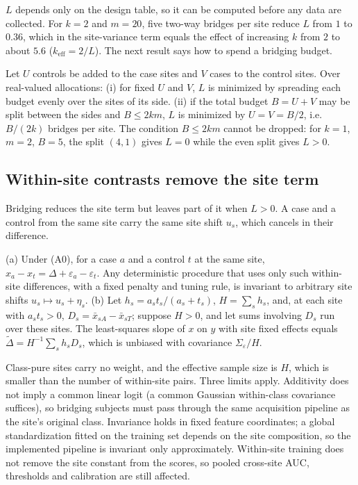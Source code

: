 $L$ depends only on the design table, so it can be computed before any data are collected. For $k=2$ and $m=20$, five two-way bridges per site reduce $L$ from $1$ to $0.36$, which in the site-variance term equals the effect of increasing $k$ from $2$ to about $5.6$ ($k_{\mathrm{eff}}=2/L$). The next result says how to spend a bridging budget.

\begin{corollary}[Allocation]\label{cor:alloc}
Let $U$ controls be added to the case sites and $V$ cases to the control sites. Over real-valued allocations: (i) for fixed $U$ and $V$, $L$ is minimized by spreading each budget evenly over the sites of its side. (ii) if the total budget $B=U+V$ may be split between the sides and $B\le 2km$, $L$ is minimized by $U=V=B/2$, i.e.\ $B/(2k)$ bridges per site. The condition $B\le 2km$ cannot be dropped: for $k=1$, $m=2$, $B=5$, the split $(4,1)$ gives $L=0$ while the even split gives $L>0$.
\end{corollary}

\subsection{Within-site contrasts remove the site term}\label{sec:prop3}

Bridging reduces the site term but leaves part of it when $L>0$. A case and a control from the same site carry the same site shift $u_s$, which cancels in their difference.

\begin{proposition}\label{prop:within}
(a) Under (A0), for a case $a$ and a control $t$ at the same site, $x_a-x_t=\Delta+\varepsilon_a-\varepsilon_t$. Any deterministic procedure that uses only such within-site differences, with a fixed penalty and tuning rule, is invariant to arbitrary site shifts $u_s\mapsto u_s+\eta_s$.
(b) Let $h_s=a_st_s/(a_s+t_s)$, $H=\sum_sh_s$, and, at each site with $a_st_s>0$, $D_s=\bar x_{sA}-\bar x_{sT}$; suppose $H>0$, and let sums involving $D_s$ run over these sites. The least-squares slope of $x$ on $y$ with site fixed effects equals $\tilde\Delta=H^{-1}\sum_sh_sD_s$, which is unbiased with covariance $\Sigma_\varepsilon/H$.
\end{proposition}

Class-pure sites carry no weight, and the effective sample size is $H$, which is smaller than the number of within-site pairs. Three limits apply. Additivity does not imply a common linear logit (a common Gaussian within-class covariance suffices), so bridging subjects must pass through the same acquisition pipeline as the site's original class. Invariance holds in fixed feature coordinates; a global standardization fitted on the training set depends on the site composition, so the implemented pipeline is invariant only approximately. Within-site training does not remove the site constant from the scores, so pooled cross-site AUC, thresholds and calibration are still affected.

